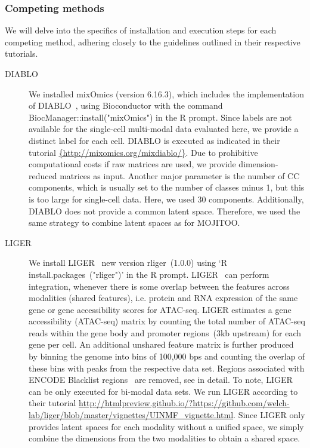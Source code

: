 \subsubsection{Competing methods}
\label{MOJITOO:exp:methods}
We will delve into the specifics of installation and execution steps for each competing method, adhering closely to the guidelines outlined in their respective tutorials.
\begin{description}
	\item[DIABLO]
    We installed mixOmics (version 6.16.3), which includes the implementation of DIABLO~\cite{singh2019diablo}, using Bioconductor with the command BiocManager::install("mixOmics") in the R prompt. Since labels are not available for the single-cell multi-modal data evaluated here, we provide a distinct label for each cell. DIABLO is executed as indicated in their tutorial \url{{http://mixomics.org/mixdiablo/}}. Due to prohibitive computational costs if raw matrices are used, we provide dimension-reduced matrices as input. Another major parameter is the number of CC components, which is usually set to the number of classes minus 1, but this is too large for single-cell data. Here, we used 30 components. Additionally, DIABLO does not provide a common latent space. Therefore, we used the same strategy to combine latent spaces as for MOJITOO.

	\item[LIGER]
    We install LIGER~\citep{kriebel2021nonnegative} new version rliger~(1.0.0) using `R install.packages~("rliger")' in the R prompt. LIGER~\citep{kriebel2021nonnegative} can perform integration, whenever there is some overlap between the features across modalities (shared features), i.e. protein and RNA expression of the same gene or gene accessibility scores for ATAC-seq. LIGER estimates a gene accessibility (ATAC-seq) matrix by counting the total number of ATAC-seq reads within the gene body and promoter regions~(3kb upstream) for each gene per cell. An additional unshared feature matrix is further produced by binning the genome into bins of 100,000 bps and counting the overlap of these bins with peaks from the respective data set. Regions associated with ENCODE Blacklist regions~\citep{amemiya2019encode} are removed, see in detail\citep{liu2020jointly}. To note, LIGER can be only executed for bi-modal data sets. We run LIGER according to their tutorial \url{http://htmlpreview.github.io/?https://github.com/welch-lab/liger/blob/master/vignettes/UINMF_vignette.html}. Since LIGER only provides latent spaces for each modality without a unified space, we simply combine the dimensions from the two modalities to obtain a shared space.


\end{description}

